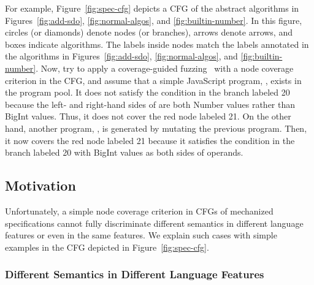 
For example, Figure~\ref{fig:spec-cfg} depicts a CFG of the abstract algorithms
in Figures~\ref{fig:add-sdo}, \ref{fig:normal-algos}, and
\ref{fig:builtin-number}.
%
In this figure, circles (or diamonds) denote nodes (or branches), arrows denote
arrows, and boxes indicate algorithms.
%
The labels inside nodes match the labels annotated in the algorithms in
Figures~\ref{fig:add-sdo}, \ref{fig:normal-algos}, and \ref{fig:builtin-number}.
%
Now, try to apply a coverage-guided fuzzing~\cite{afl} with a node coverage
criterion in the CFG, and assume that a simple JavaScript program, , exists in the program pool.
%
It does not satisfy the condition in the branch labeled 20 because the left- and
right-hand sides of  are both Number values rather than BigInt
values.
%
Thus, it does not cover the red node labeled 21.
%
On the other hand, another program, , is generated by mutating
the previous program.
%
Then, it now covers the red node labeled 21 because it satisfies the condition
in the branch labeled 20 with BigInt values as both sides of operands.


\subsection{Motivation}\label{sec:motiv}

Unfortunately, a simple node coverage criterion in CFGs of mechanized
specifications cannot fully discriminate different semantics in different
language features or even in the same features.
%
We explain such cases with simple examples in the CFG depicted in
Figure~\ref{fig:spec-cfg}.


\subsubsection{Different Semantics in Different Language
Features}\label{sec:diff-feat}

